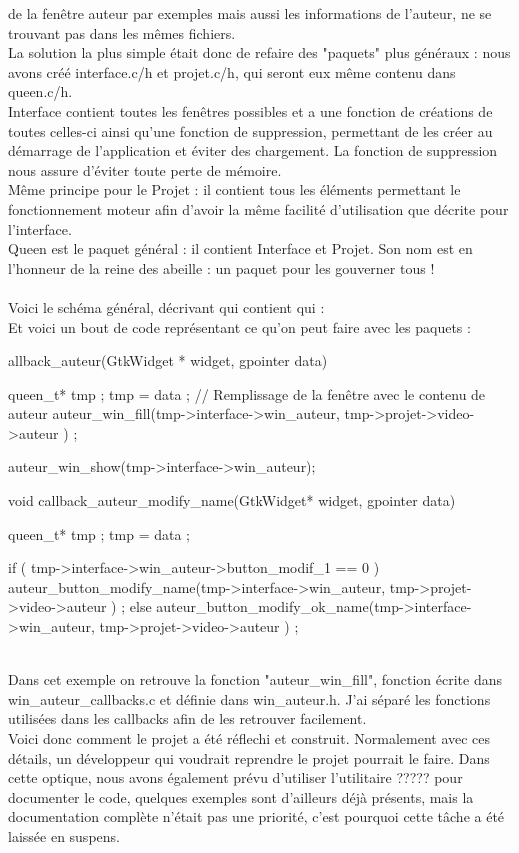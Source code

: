\documentclass[11pt,french,a4paper]{report}
\begin{document}
de la fenêtre auteur par exemples mais aussi les informations de l'auteur, ne se trouvant pas dans les mêmes fichiers.  \\
La solution la plus simple était donc de refaire des "paquets" plus généraux : nous avons créé interface.c/h et projet.c/h, qui seront eux
même contenu dans queen.c/h. \\
Interface contient toutes les fenêtres possibles et a une fonction de créations de toutes celles-ci ainsi qu'une fonction de suppression, 
permettant de les créer au démarrage de l'application et éviter des chargement. La fonction de suppression nous assure d'éviter toute perte de mémoire.\\
Même principe pour le Projet : il contient tous les éléments permettant le fonctionnement moteur afin d'avoir la même facilité
d'utilisation que décrite pour l'interface. \\
Queen est le paquet général : il contient Interface et Projet. Son nom est en l'honneur de la reine des abeille : un paquet pour les gouverner tous ! \\
\\
Voici le schéma général, décrivant qui contient qui :%
\\
Et voici un bout de code représentant ce qu'on peut faire avec les paquets : 

allback\_auteur(GtkWidget * widget, gpointer data)
 {
     queen\_t* tmp ;
     tmp = data ;
     // Remplissage de la fenêtre avec le contenu de auteur
     auteur\_win\_fill(tmp->interface->win\_auteur, tmp->projet->video->auteur ) ;

     auteur\_win\_show(tmp->interface->win\_auteur);
 }
 void callback\_auteur\_modify\_name(GtkWidget* widget, gpointer data) {
         queen\_t* tmp ;
         tmp = data ;

         if ( tmp->interface->win\_auteur->button\_modif\_1 == 0 )
         auteur\_button\_modify\_name(tmp->interface->win\_auteur, tmp->projet->video->auteur ) ;
         else
         auteur\_button\_modify\_ok\_name(tmp->interface->win\_auteur, tmp->projet->video->auteur ) ;
   }

\\
Dans cet exemple on retrouve la fonction "auteur\_win\_fill", fonction écrite dans win\_auteur\_callbacks.c et définie
dans win\_auteur.h. J'ai séparé les fonctions utilisées dans les callbacks afin de les retrouver facilement. \\

Voici donc comment le projet a été réflechi et construit. Normalement avec ces détails, un développeur qui voudrait reprendre
le projet pourrait le faire. Dans cette optique, nous avons également prévu d'utiliser %
l'utilitaire ????? pour documenter le code, quelques exemples sont d'ailleurs déjà présents, mais la documentation 
complète n'était pas une priorité, c'est pourquoi cette tâche a été laissée en suspens. 
       
\end{document}
